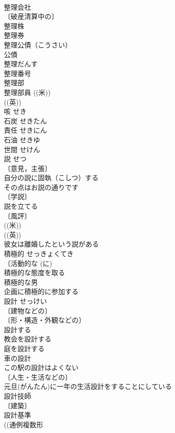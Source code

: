 \documentclass[8pt]{extreport}
\begin{document}
\begin{CJK}{UTF8}{min}
\\	整理会社 
\\	〔破産清算中の〕
\\	整理株 
\\	整理券 
\\	整理公債（こうさい） 
\\	公債 
\\	整理だんす 
\\	整理番号 
\\	整理部 
\\	整理部員 ((米)) 
\\	((英)) 
\\	咳	せき	
\\	石炭	せきたん	
\\	責任	せきにん	
\\	石油	せきゆ	
\\	世間	せけん	
\\	説	せつ	
\\	〔意見，主張〕
\\	自分の説に固執（こしつ）する 
\\	その点はお説の通りです 
\\	〔学説〕
\\	説を立てる 
\\	〔風評〕
\\	((米)) 
\\	((英)) 
\\	彼女は離婚したという説がある 
\\	積極的	せっきょくてき	
\\	〔活動的な (に) 
\\	積極的な態度を取る 
\\	積極的な男 
\\	企画に積極的に参加する 
\\	設計	せっけい	
\\	〔建物などの〕
\\	〔形・構造・外観などの〕
\\	設計する 
\\	教会を設計する 
\\	庭を設計する 
\\	車の設計 
\\	この駅の設計はよくない 
\\	〔人生・生活などの〕
\\	元旦(がんたん)に一年の生活設計をすることにしている 
\\	設計技師 
\\	〔建築〕
\\	設計基準 
\\	((通例複数形 

\end{CJK}
\end{document}
